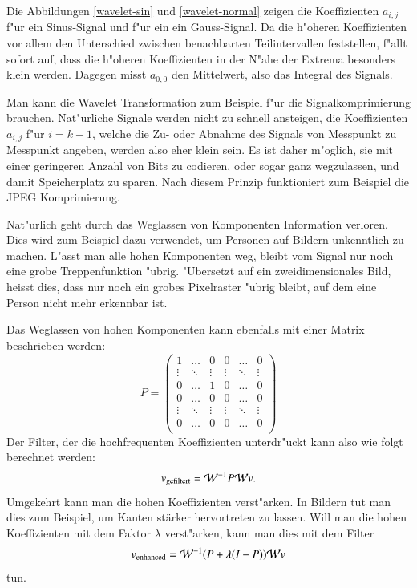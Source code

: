 Die Abbildungen \ref{wavelet-sin} und \ref{wavelet-normal} zeigen
die Koeffizienten $a_{i,j}$ f"ur ein Sinus-Signal und f"ur ein
ein Gauss-Signal. Da die h"oheren Koeffizienten vor allem den
Unterschied zwischen benachbarten Teilintervallen feststellen,
f"allt sofort auf, dass die h"oheren Koeffizienten in der
N"ahe der Extrema besonders klein werden.
Dagegen misst $a_{0,0}$ den Mittelwert, also das Integral des Signals.

Man kann die Wavelet Transformation zum Beispiel f"ur die Signalkomprimierung
brauchen. Nat"urliche Signale werden nicht zu schnell ansteigen, die
Koeffizienten $a_{i,j}$ f"ur $i=k-1$, welche die Zu- oder Abnahme des
Signals von Messpunkt zu Messpunkt angeben, werden also eher klein
sein. Es ist daher m"oglich, sie mit einer geringeren Anzahl von Bits
zu codieren, oder sogar ganz wegzulassen, und damit Speicherplatz zu
sparen. Nach diesem Prinzip funktioniert zum Beispiel die JPEG Komprimierung.

Nat"urlich geht durch das Weglassen von Komponenten Information verloren.
Dies wird zum Beispiel dazu verwendet, um Personen auf Bildern unkenntlich
zu machen. L"asst man alle hohen Komponenten weg, bleibt vom Signal
nur noch eine grobe Treppenfunktion "ubrig.
"Ubersetzt auf ein zweidimensionales Bild, heisst dies, dass nur noch
ein grobes Pixelraster "ubrig bleibt, auf dem eine Person nicht mehr
erkennbar ist.

Das Weglassen von hohen Komponenten kann ebenfalls mit einer Matrix
beschrieben werden:
$$
P=\begin{pmatrix}
1&\dots&0&0&\dots&0\\
\vdots&\ddots&\vdots&\vdots&\ddots&\vdots\\
0&\dots&1&0&\dots&0\\
0&\dots&0&0&\dots&0\\
\vdots&\ddots&\vdots&\vdots&\ddots&\vdots\\
0&\dots&0&0&\dots&0\\
\end{pmatrix}
$$
Der Filter, der die hochfrequenten Koeffizienten unterdr"uckt kann
also wie folgt berechnet werden:
$$
v_{\text{gefiltert}}={\cal W}^{-1}P{\cal W}v.
$$
Umgekehrt kann man die hohen Koeffizienten verst"arken. In Bildern tut
man dies zum Beispiel, um Kanten  stärker hervortreten zu lassen.
Will man die hohen Koeffizienten mit dem Faktor $\lambda$ verst"arken,
kann man dies mit dem Filter
$$
v_{\text{enhanced}}={\cal W}^{-1}(P + \lambda(I-P)){\cal W}v
$$
tun.
